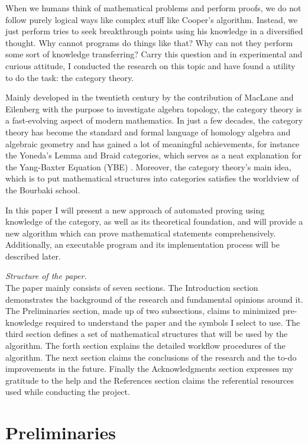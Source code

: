 \documentclass[preprint]{elsarticle}
\numberwithin{theorem}{section}	%
\numberwithin{axiom}{section}	%
\numberwithin{definition}{section}	%
\begin{document}
When we humans think of mathematical problems and perform proofs, we do not follow purely logical ways like complex stuff like Cooper{'}s algorithm. Instead, we just perform tries to seek breakthrough points using his knowledge in a diversified thought. Why cannot programs do things like that? Why can not they perform some sort of knowledge transferring? Carry this question and in experimental and curious attitude, I conducted the research on this topic and have found a utility to do the task: the category theory.

Mainly developed in the twentieth century by the contribution of MacLane and Eilenberg with the purpose to investigate algebra topology, the category theory is a fast-evolving aspect of modern mathematics. In just a few decades, the category theory has become the standard and formal language of homology algebra and algebraic geometry and has gained a lot of meaningful achievements, for instance the Yoneda{'}s Lemma and Braid categories, which serves as a neat explanation for the Yang-Baxter Equation (YBE) \cite{Li2019}. Moreover, the category theory{'}s main idea, which is to put mathematical structures into categories satisfies the worldview of the Bourbaki school.

In this paper I will present a new approach of automated proving using knowledge of the category, as well as its theoretical foundation, and will provide a new algorithm which can prove mathematical statements comprehensively. Additionally, an executable program and its implementation process will be described later.

\textit{ Structure of the paper.}\\
The paper mainly consists of seven sections. The Introduction section demonstrates the background of the research and fundamental opinions around it. The Preliminaries section, made up of two subsections, claims to minimized pre-knowledge required to understand the paper and the symbols I select to use. The third section defines a set of mathematical structures that will be used by the algorithm. The forth section explains the detailed workflow procedures of the algorithm. The next section claims the conclusions of the research and the to-do improvements in the future. Finally the Acknowledgments section expresses my gratitude to the help and the References section claims the referential resources used while conducting the project.

\section{Preliminaries}
\end{document}

